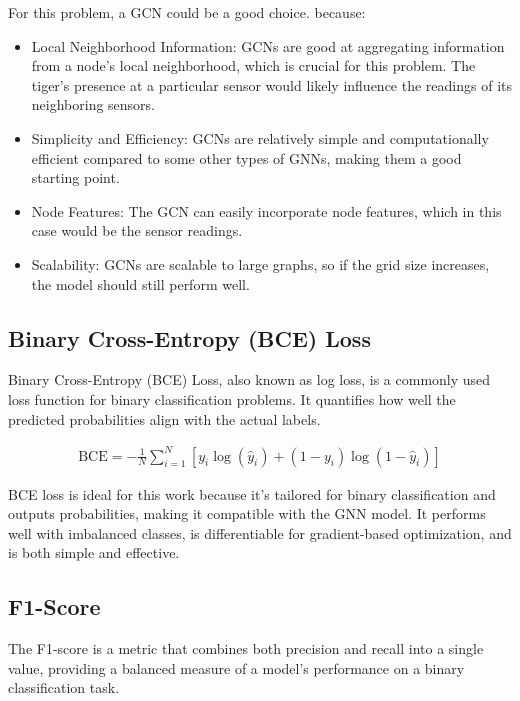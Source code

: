 \documentclass{article}
\begin{document}
For this problem, a GCN could be a good choice. because:

  \begin{itemize}
    \item Local Neighborhood Information: GCNs are good at aggregating information from a node's local neighborhood, which is crucial for this problem. The tiger's presence at a particular sensor would likely influence the readings of its neighboring sensors.
  
    \item Simplicity and Efficiency: GCNs are relatively simple and computationally efficient compared to some other types of GNNs, making them a good starting point.
  
    \item Node Features: The GCN can easily incorporate node features, which in this case would be the sensor readings.
  
    \item Scalability: GCNs are scalable to large graphs, so if the grid size increases, the model should still perform well.
  \end{itemize}

\subsection{Binary Cross-Entropy (BCE) Loss}
\label{ssec:bce}

Binary Cross-Entropy (BCE)\cite{domingos2012few}  Loss, also known as log loss, is a commonly used loss function for binary classification problems. It quantifies how well the predicted probabilities align with the actual labels.

\begin{align}
  \text{BCE} = -\frac{1}{N} \sum_{i=1}^{N} [y_i \log(\hat{y}_i) + (1 - y_i) \log(1 - \hat{y}_i)]
\end{align}

BCE loss is ideal for this work because it's tailored for binary classification and outputs probabilities, making it compatible with the GNN model. It performs well with imbalanced classes, is differentiable for gradient-based optimization, and is both simple and effective.

\subsection{F1-Score}
\label{ssec:f1}

The F1-score is a metric that combines both precision and recall into a single value, providing a balanced measure of a model's performance on a binary classification task.
\end{document}
